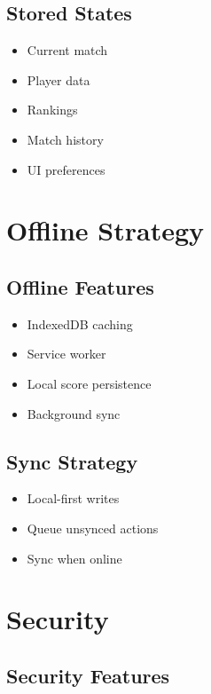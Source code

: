 \documentclass[11pt,a4paper]{article}
\begin{document}
\subsection{Stored States}
\begin{itemize}
    \item Current match
    \item Player data
    \item Rankings
    \item Match history
    \item UI preferences
\end{itemize}

\section{Offline Strategy}

\subsection{Offline Features}

\begin{itemize}
    \item IndexedDB caching
    \item Service worker
    \item Local score persistence
    \item Background sync
\end{itemize}

\subsection{Sync Strategy}

\begin{itemize}
    \item Local-first writes
    \item Queue unsynced actions
    \item Sync when online
\end{itemize}

\section{Security}

\subsection{Security Features}
\end{document}
